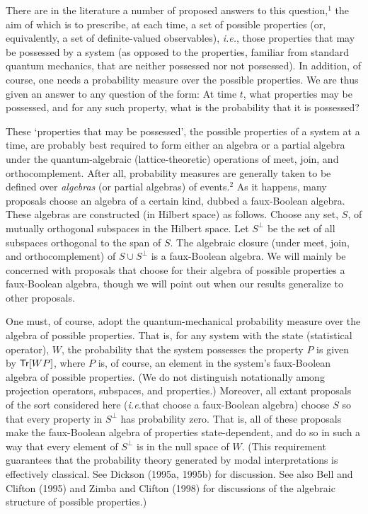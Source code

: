 \documentclass[12pt]{article}
\newcommand{\ie}{{\it i.e.}}         %
\newcommand{\Tr}[1]{\mbox{{\sf Tr}$[#1]$}}                      %
\begin{document}
There are in the literature a number of proposed answers to this 
question,$^1$ the aim of which is to prescribe, at each time, a set of 
possible properties (or, equivalently, a set of definite-valued 
observables), \ie, those properties that may be possessed by a system 
(as opposed to the properties, familiar from standard quantum 
mechanics, that are neither possessed nor not possessed).  In 
addition, of course, one needs a probability measure over 
the possible properties.  We are thus given an answer to any question 
of the form: At time $t$, what properties may be possessed, and for 
any such property, what is the probability that it is possessed?

These `properties that may be possessed', the possible properties of a 
system at a time, are probably best required to form either an algebra 
or a partial algebra under the quantum-algebraic (lattice-theoretic) 
operations of meet, join, and orthocomplement.  After all, probability 
measures are generally taken to be defined over {\it algebras} (or 
partial algebras) of events.$^2$ As it happens, many proposals choose 
an algebra of a certain kind, dubbed a faux-Boolean algebra.  These 
algebras are constructed (in Hilbert space) as follows.  Choose any 
set, $S$, of mutually orthogonal subspaces in the Hilbert space.  Let 
$S^{\perp}$ be the set of all subspaces orthogonal to the span of $S$.  
The algebraic closure (under meet, join, and orthocomplement) of $S 
\cup S^{\perp}$ is a faux-Boolean algebra.  We will mainly be 
concerned with proposals that choose for their algebra of possible 
properties a faux-Boolean algebra, though we will point out when our 
results generalize to other proposals.

One must, of course, adopt the quantum-mechanical probability measure 
over the algebra of possible properties.  That is, for any system with 
the state (statistical operator), $W$, the probability that the system 
possesses the property $P$ is given by $\Tr{WP}$, where $P$ is, of 
course, an element in the system's faux-Boolean algebra of possible 
properties.  (We do not distinguish notationally among projection 
operators, subspaces, and properties.) Moreover, all extant proposals 
of the sort considered here (\ie that choose a faux-Boolean algebra) 
choose $S$ so that every property in $S^{\perp}$ has probability zero.  
That is, all of these proposals make the faux-Boolean algebra of 
properties state-dependent, and do so in such a way that every element 
of $S^{\perp}$ is in the null space of $W$.  (This requirement 
guarantees that the probability theory generated by modal 
interpretations is effectively classical.  See Dickson (1995a, 1995b) 
for discussion.  See also Bell and Clifton (1995) and Zimba and 
Clifton (1998) for discussions of the algebraic structure of possible 
properties.)
\end{document}
